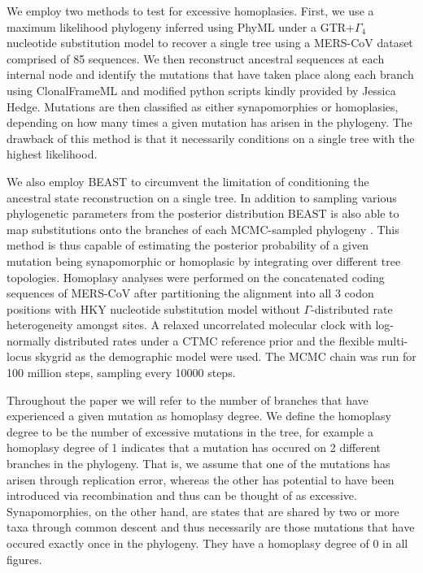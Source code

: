 \documentclass[11pt,oneside,letterpaper]{article}
\begin{document}
We employ two methods to test for excessive homoplasies.
First, we use a maximum likelihood phylogeny inferred using PhyML \citep{guindon_2003} under a GTR+$\Gamma_{4}$ \citep{tavare_1986,yang_1994} nucleotide substitution model to recover a single tree using a MERS-CoV dataset comprised of 85 sequences.
We then reconstruct ancestral sequences at each internal node and identify the mutations that have taken place along each branch using ClonalFrameML \citep{didelot_2007} and modified python scripts kindly provided by Jessica Hedge.
Mutations are then classified as either synapomorphies or homoplasies, depending on how many times a given mutation has arisen in the phylogeny.
The drawback of this method is that it necessarily conditions on a single tree with the highest likelihood.

We also employ BEAST \citep{drummond_2012} to circumvent the limitation of conditioning the ancestral state reconstruction on a single tree.
In addition to sampling various phylogenetic parameters from the posterior distribution BEAST is also able to map substitutions onto the branches of each MCMC-sampled phylogeny \citep{obrien_2009}.
This method is thus capable of estimating the posterior probability of a given mutation being synapomorphic or homoplasic by integrating over different tree topologies.
Homoplasy analyses were performed on the concatenated coding sequences of MERS-CoV after partitioning the alignment into all 3 codon positions with HKY nucleotide substitution model without $\Gamma$-distributed rate heterogeneity amongst sites.
A relaxed uncorrelated molecular clock with log-normally distributed rates under a CTMC reference prior and the flexible multi-locus skygrid as the demographic model were used.
The MCMC chain was run for 100 million steps, sampling every 10000 steps.

Throughout the paper we will refer to the number of branches that have experienced a given mutation as homoplasy degree.
We define the homoplasy degree to be the number of excessive mutations in the tree, for example a homoplasy degree of 1 indicates that a mutation has occured on 2 different branches in the phylogeny.
That is, we assume that one of the mutations has arisen through replication error, whereas the other has potential to have been introduced via recombination and thus can be thought of as excessive.
Synapomorphies, on the other hand, are states that are shared by two or more taxa through common descent and thus necessarily are those mutations that have occured exactly once in the phylogeny.
They have a homoplasy degree of 0 in all figures.
\end{document}
